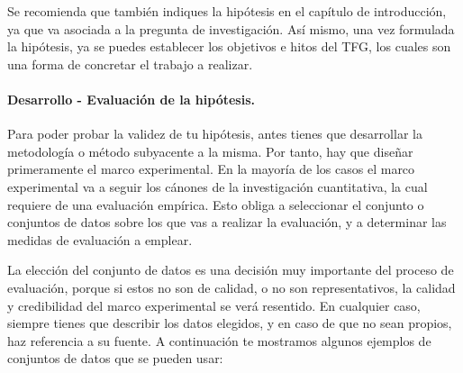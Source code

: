 Se recomienda que también indiques la hipótesis en el capítulo de introducción, ya que va asociada a la pregunta de investigación. Así mismo, una vez formulada la hipótesis, ya se puedes establecer los objetivos e hitos del TFG, los cuales son una forma de concretar el trabajo a realizar.

\paragraph{Desarrollo - Evaluación de la hipótesis\textnormal{.}} Para poder probar la validez de tu hipótesis, antes tienes que desarrollar la metodología o método subyacente a la misma. Por tanto, hay que diseñar primeramente el marco experimental. En la mayoría de los casos el marco experimental va a seguir los cánones de la investigación cuantitativa, la cual requiere de una evaluación empírica. Esto obliga a seleccionar el conjunto o conjuntos de datos sobre los que vas a realizar la evaluación, y a determinar las medidas de evaluación a emplear.

La elección del conjunto de datos es una decisión muy importante del proceso de evaluación, porque si estos no son de calidad, o no son representativos, la calidad y credibilidad del marco experimental se verá resentido. En cualquier caso, siempre tienes que describir los datos elegidos, y en caso de que no sean propios, haz referencia a su fuente. A continuación te mostramos algunos ejemplos de conjuntos de datos que se pueden usar:

